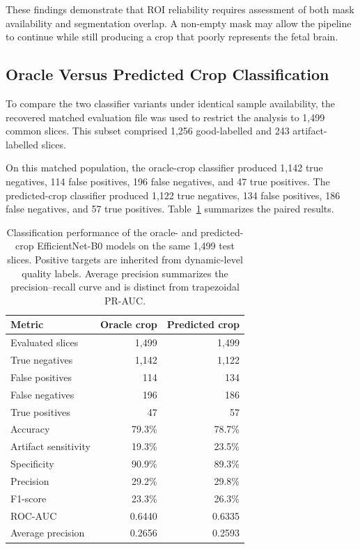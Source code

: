 These findings demonstrate that ROI reliability requires assessment of both mask availability and segmentation overlap. A non-empty mask may allow the pipeline to continue while still producing a crop that poorly represents the fetal brain.

\subsection{Oracle Versus Predicted Crop Classification}
\label{subsec:results_matched_crops}

To compare the two classifier variants under identical sample availability, the recovered matched evaluation file was used to restrict the analysis to 1,499 common slices. This subset comprised 1,256 good-labelled and 243 artifact-labelled slices.

On this matched population, the oracle-crop classifier produced 1,142 true negatives, 114 false positives, 196 false negatives, and 47 true positives. The predicted-crop classifier produced 1,122 true negatives, 134 false positives, 186 false negatives, and 57 true positives. Table~\ref{tab:results_matched_oracle_predicted} summarizes the paired results.

\begin{table}[htbp]
\centering
\caption{Classification performance of the oracle- and predicted-crop EfficientNet-B0 models on the same 1,499 test slices. Positive targets are inherited from dynamic-level quality labels. Average precision summarizes the precision--recall curve and is distinct from trapezoidal PR-AUC.}
\label{tab:results_matched_oracle_predicted}
\begin{tabular}{lrr}
\hline
Metric & Oracle crop & Predicted crop \\
\hline
Evaluated slices & 1,499 & 1,499 \\
True negatives & 1,142 & 1,122 \\
False positives & 114 & 134 \\
False negatives & 196 & 186 \\
True positives & 47 & 57 \\
Accuracy & 79.3\% & 78.7\% \\
Artifact sensitivity & 19.3\% & 23.5\% \\
Specificity & 90.9\% & 89.3\% \\
Precision & 29.2\% & 29.8\% \\
F1-score & 23.3\% & 26.3\% \\
ROC-AUC & 0.6440 & 0.6335 \\
Average precision & 0.2656 & 0.2593 \\
\hline
\end{tabular}
\end{table}

